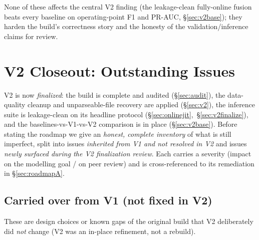 \documentclass[11pt,a4paper]{article}
\begin{document}
	None of these affects the central V2 finding (the leakage-clean fully-online
	fusion beats every baseline on operating-point F1 and PR-AUC,
	\S\ref{sec:v2base}); they harden the build's correctness story and the honesty of
	the validation/inference claims for review.

	\section{V2 Closeout: Outstanding Issues}\label{sec:closeout}
	V2 is now \emph{finalized}: the build is complete and audited (\S\ref{sec:audit}),
	the data-quality cleanup and unparseable-file recovery are applied
	(\S\ref{sec:v2}), the inference suite is leakage-clean on its headline protocol
	(\S\ref{sec:onlinejit},~\S\ref{sec:v2finalize}), and the
	baselines-vs-V1-vs-V2 comparison is in place (\S\ref{sec:v2base}). Before
	stating the roadmap we give an \emph{honest, complete inventory} of what is still
	imperfect, split into issues \emph{inherited from V1 and not resolved in V2} and
	issues \emph{newly surfaced during the V2 finalization review}. Each carries a
	severity (impact on the modelling goal / on peer review) and is cross-referenced
	to its remediation in \S\ref{sec:roadmapA}.

	\subsection{Carried over from V1 (not fixed in V2)}\label{sec:carryover}
	These are design choices or known gaps of the original build that V2
	deliberately did \emph{not} change (V2 was an in-place refinement, not a rebuild).
\end{document}
